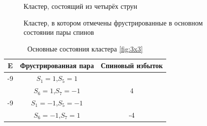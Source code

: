 \documentclass[utf8, babel, sor, jor, amsmath, amssymb, reprint]{elsarticle} %
\begin{document}
\begin{figure}
	\centering
	\caption{Кластер, состоящий из четырёх струн}
	\label{fig:cl}
\end{figure}

\begin{figure}
	\centering
	\caption{Кластер, в котором отмечены фрустрированные в основном состоянии пары спинов}
	\label{fig:clF}
\end{figure}

\begin{table}[h]
	\centering
	\begin{tabular}{|c|c|c|}
		\hline
		E   &   Фрустрированная пара & Спиновый избыток\\
		\hline
		-9   &  $S_1=1$,$S_5=1$&\\
		&    $S_6=1$,$S_7=-1$ & 4\\
		\hline
		-9   &  $S_1=-1$,$S_5=-1$&\\
		&    $S_6=-1$,$S_7=1$ & -4\\
		\hline
	\end{tabular}
	\caption{Основные состояния кластера \ref{fig:3x3}}
	\label{tab:gscl}
\end{table} 
\end{document}
